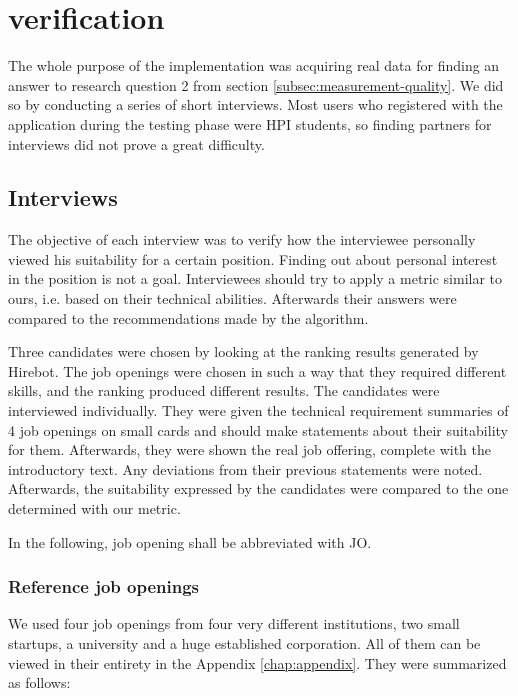 \chapter{verification}\label{ch:verification}
The whole purpose of the implementation was acquiring real data for finding an answer to research question 2 from section \ref{subsec:measurement-quality}. We did so by conducting a series of short interviews. Most users who registered with the application during the testing phase were HPI students, so finding partners for interviews did not prove a great difficulty.

\section{Interviews}\label{sec:interviews}
The objective of each interview was to verify how the interviewee personally viewed his suitability for a certain position. Finding out about personal interest in the position is not a goal. Interviewees should try to apply a metric similar to ours, i.e. based on their technical abilities. Afterwards their answers were compared to the recommendations made by the algorithm.

Three candidates were chosen by looking at the ranking results generated by Hirebot. The job openings were chosen in such a way that they required different skills, and the ranking produced different results. The candidates were interviewed individually. They were given the technical requirement summaries of 4 job openings on small cards and should make statements about their suitability for them. Afterwards, they were shown the real job offering, complete with the introductory text. Any deviations from their previous statements were noted. Afterwards, the suitability expressed by the candidates were compared to the one determined with our metric.

In the following, job opening shall be abbreviated with JO.

\subsection{Reference job openings}
We used four job openings from four very different institutions, two small startups, a university and a huge established corporation. All of them can be viewed in their entirety in the Appendix \ref{chap:appendix}. They were summarized as follows:

